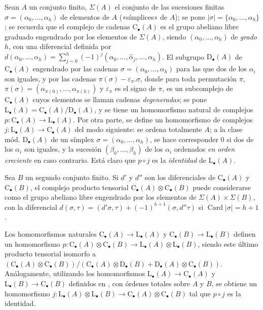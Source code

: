 \begin{env}[11.8.1]
\label{0.11.8.1-fr}
Sean $A$ un conjunto finito, $\Sigma(A)$ el conjunto de las sucesiones finitas $\sigma=(\alpha_0,\ldots,\alpha_h)$ de elementos de $A$ («símplices» de $A$); se pone $|\sigma|=\{\alpha_0,\ldots,\alpha_h\}$; se recuerda que el complejo de cadenas $\mathrm C_\bullet(A)$ es el grupo abeliano libre graduado engendrado por los elementos de $\Sigma(A)$, siendo $(\alpha_0,\ldots,\alpha_h)$ de \emph{grado} $h$, con una diferencial definida por $d(\alpha_0,\ldots,\alpha_h)=\sum_{j=0}^{h}(-1)^j(\alpha_0,\ldots,\widehat{\alpha}_j,\ldots,\alpha_h)$. El subgrupo $\mathrm D_\bullet(A)$ de $\mathrm C_\bullet(A)$ engendrado por las cadenas $\sigma=(\alpha_0,\ldots,\alpha_h)$ para las que dos de los $\alpha_i$ son iguales, y por las cadenas $\pi(\sigma)-\varepsilon_\pi.\sigma$, donde para toda permutación $\pi$, $\pi(\sigma)=(\alpha_{\pi(0)},\ldots,\alpha_{\pi(h)})$ y $\varepsilon_\pi$ es el signo de $\pi$, es un subcomplejo de $\mathrm C_\bullet(A)$ cuyos elementos se llaman cadenas \emph{degeneradas}; se pone $\mathrm L_\bullet(A)=\mathrm C_\bullet(A)/\mathrm D_\bullet(A)$, y se tiene un homomorfismo natural de complejos $p:\mathrm C_\bullet(A)\longrightarrow\mathrm L_\bullet(A)$. Por otra parte, se define un homomorfismo de complejos $j:\mathrm L_\bullet(A)\longrightarrow\mathrm C_\bullet(A)$ del modo siguiente: se ordena totalmente $A$; a la clase mód. $\mathrm D_\bullet(A)$ de un símplex $\sigma=(\alpha_0,\ldots,\alpha_h)$, se hace corresponder $0$ si dos de los $\alpha_i$ son iguales, y la sucesión $(\beta_0,\ldots,\beta_h)$ de los $\alpha_i$ ordenados \emph{en orden creciente} en caso contrario. Está claro que $p\circ
j$ es la \emph{identidad} de $\mathrm L_\bullet(A)$.
\end{env}

\begin{env}[11.8.2]
\label{0.11.8.2}
\label{0.11.8.2-fr}
Sea $B$ un segundo conjunto finito.
Si $d'$ y $d''$ son los diferenciales de
$\mathrm C_\bullet(A)$ y $\mathrm C_\bullet(B)$, el complejo producto
tensorial
$\mathrm C_\bullet(A)\otimes\mathrm C_\bullet(B)$
puede considerarse como el grupo abeliano libre engendrado por los elementos de
$\Sigma(A)\times\Sigma(B)$, con la diferencial
$d(\sigma,\tau)=(d'\sigma,\tau)+(-1)^{h+1}(\sigma,d''\tau)$ si $\operatorname{Card}|\sigma|=h+1$.

Los homomorfismos naturales
$\mathrm C_\bullet(A)\to\mathrm L_\bullet(A)$ y
$\mathrm C_\bullet(B)\to\mathrm L_\bullet(B)$ definen un homomorfismo
$p:\mathrm C_\bullet(A)\otimes\mathrm C_\bullet(B)\longrightarrow\mathrm L_\bullet(A)\otimes\mathrm L_\bullet(B)$,
siendo este último producto tensorial isomorfo a
$(\mathrm C_\bullet(A)\otimes\mathrm C_\bullet(B))/(\mathrm C_\bullet(A)\otimes\mathrm D_\bullet(B)+\mathrm D_\bullet(A)\otimes\mathrm C_\bullet(B))$.
Análogamente, utilizando los homomorfismos
$\mathrm L_\bullet(A)\to\mathrm C_\bullet(A)$ y
$\mathrm L_\bullet(B)\to\mathrm C_\bullet(B)$ definidos en
, con órdenes totales sobre $A$ y $B$, se obtiene un
homomorfismo
$j:\mathrm L_\bullet(A)\otimes\mathrm L_\bullet(B)\longrightarrow\mathrm C_\bullet(A)\otimes\mathrm C_\bullet(B)$
tal que $p\circ j$ es la identidad.
\end{env}

